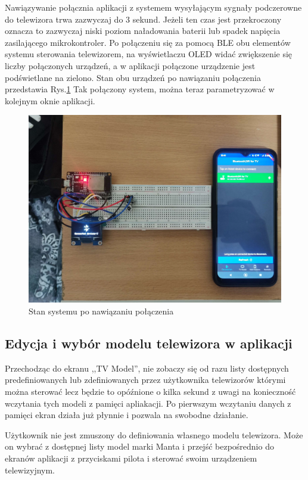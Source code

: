 \documentclass[12pt,twoside,draft]{article}
\begin{document}
Nawiązywanie połącznia aplikacji z systemem wysyłającym sygnały podczerowne do telewizora trwa zazwyczaj do 3 sekund. Jeżeli ten czas jest przekroczony oznacza to zazwyczaj niski poziom naładowania baterii lub spadek napięcia zasilającego mikrokontroler. Po połączeniu się za pomocą BLE obu elementów systemu sterowania telewizorem, na wyświetlaczu OLED widać zwiększenie się liczby połączonych urządzeń, a w aplikacji połączone urządzenie jest podświetlane na zielono. Stan obu urządzeń po nawiązaniu połączenia przedstawia Rys.\ref*{Fig:connectingTest} Tak połączony system, można teraz parametryzować w kolejnym oknie aplikacji.
\begin{figure}[ht]
   \centering
   \includegraphics[width=14cm]{images/connectingTest.jpg}
   \caption{Stan systemu po nawiązaniu połączenia}
   \label{Fig:connectingTest}
\end{figure}

\subsection{Edycja i wybór modelu telewizora w aplikacji}
Przechodząc do ekranu ,,TV Model'', nie zobaczy się od razu listy dostępnych predefiniowanych lub zdefiniowanych przez użytkownika telewizorów którymi można sterować lecz będzie to opóźnione o kilka sekund z uwagi na konieczność wczytania tych modeli z pamięci apliakacji. Po pierwszym wczytaniu danych z pamięci ekran działa już płynnie i pozwala na swobodne działanie.

Użytkownik nie jest zmuszony do definiowania własnego modelu telewizora. Może on wybrać z dostępnej listy model marki Manta i przejść bezpośrednio do ekranów aplikacji z przyciskami pilota i sterować swoim urządzeniem telewizyjnym.
\end{document}
